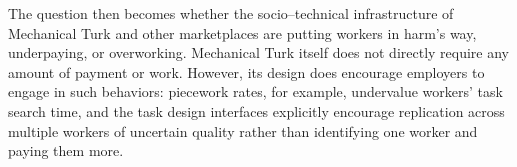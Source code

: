 \documentclass[11pt]{article}
\begin{document}
The question then becomes
whether the socio--technical infrastructure of Mechanical Turk
and other marketplaces
are putting workers in harm's way, underpaying, or overworking.
Mechanical Turk itself does not directly require any amount of payment or work.
However, its design does encourage employers to engage in such behaviors:
piecework rates, for example, undervalue workers' task search time, and
the task design interfaces explicitly encourage
replication across multiple workers of uncertain quality rather than
identifying one worker and paying them more.








\end{document}
